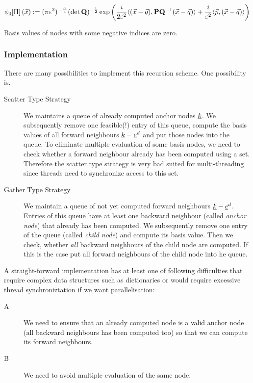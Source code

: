 \documentclass{article}
\begin{document}
\begin{equation}
\label{eq:phi0_Dd}
  \phi_{\underline{0}}[\Pi]\left(\vec{x}\right)
  :=
  (\pi\varepsilon^2)^{-\frac{D}{4}} (\det\mathbf{Q})^{-\frac{1}{2}}
  \exp \left( \frac{i}{2\varepsilon^2}
  \langle (\vec{x}-\vec{q}) , \mathbf{P}\mathbf{Q}^\mathrm{-1}(\vec{x}-\vec{q}) \rangle
  + \frac{i}{\varepsilon^2} \langle \vec{p} , (\vec{x}-\vec{q}) \rangle
 \right)
\end{equation}

Basis values of nodes with some negative indices are zero.

\subsubsection{Implementation}
There are many possibilities to implement this recursion scheme. One
possibility is.
\begin{description}
\item[Scatter Type Strategy]
  We maintains a queue of already computed anchor nodes $\underline{k}$. 
  We subsequently remove one feasible(!) entry of this queue, compute the basis values of
  all forward neighbours $\underline{k}-\underline{e}^d$ and put those nodes into the queue.
  To eliminate multiple evaluation of some basis nodes, we need to check whether
  a forward neighbour already has been computed using a set.
  Therefore the scatter type strategy is very bad suited for multi-threading
  since threads need to synchronize access to this set.
\item[Gather Type Strategy]
  We maintain a queue of not yet computed forward neighbours $\underline{k}-\underline{e}^d$. Entries of this
  queue have at least one backward neighbour (called \emph{anchor node}) that already has been computed.
  We subsequently remove one entry of the queue (called \emph{child node}) and compute its basis value.
  Then we check, whether \emph{all} backward neighbours of the child node are computed. If this is the case
  put all forward neighbours of the child node into he queue.
\end{description}

A straight-forward implementation has at least one of following difficulties that require
complex data structures such as dictionaries or would require excessive thread synchroniztation
if we want parallelisation:
\begin{description}
\item[A]
  We need to ensure that an already computed node is a valid anchor node
  (all backward neighbours has been computed too) so that we can compute its forward neighbours.
\item[B]
  We need to avoid multiple evaluation of the same node.
\end{description}
\end{document}
